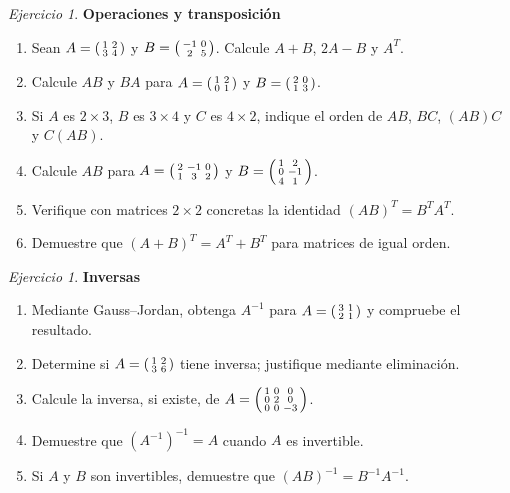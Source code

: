 \documentclass[12pt]{article}
\theoremstyle{remark}
\newtheorem{Ejer}[definicion]{Ejercicio}
\begin{document}
\begin{Ejer} \textbf{Operaciones y transposición}
\begin{enumerate}[start=6]
\item Sean $A=\begin{psmallmatrix}1&2\\3&4\end{psmallmatrix}$ y $B=\begin{psmallmatrix}-1&0\\2&5\end{psmallmatrix}$. Calcule $A+B$, $2A-B$ y $A^T$.
\item Calcule $AB$ y $BA$ para $A=\begin{psmallmatrix}1&2\\0&1\end{psmallmatrix}$ y $B=\begin{psmallmatrix}2&0\\1&3\end{psmallmatrix}$.
\item Si $A$ es $2\times3$, $B$ es $3\times4$ y $C$ es $4\times2$, indique el orden de $AB$, $BC$, $(AB)C$ y $C(AB)$.
\item Calcule $AB$ para $A=\begin{psmallmatrix}2&-1&0\\1&3&2\end{psmallmatrix}$ y $B=\begin{psmallmatrix}1&2\\0&-1\\4&1\end{psmallmatrix}$.
\item Verifique con matrices $2\times2$ concretas la identidad $(AB)^T=B^TA^T$.
\item Demuestre que $(A+B)^T=A^T+B^T$ para matrices de igual orden.
\end{enumerate}
\end{Ejer}

\begin{Ejer} \textbf{Inversas}
\begin{enumerate}[start=12]
\item Mediante Gauss--Jordan, obtenga $A^{-1}$ para $A=\begin{psmallmatrix}3&1\\2&1\end{psmallmatrix}$ y compruebe el resultado.
\item Determine si $A=\begin{psmallmatrix}1&2\\3&6\end{psmallmatrix}$ tiene inversa; justifique mediante eliminación.
\item Calcule la inversa, si existe, de $A=\begin{psmallmatrix}1&0&0\\0&2&0\\0&0&-3\end{psmallmatrix}$.
\item Demuestre que $(A^{-1})^{-1}=A$ cuando $A$ es invertible.
\item Si $A$ y $B$ son invertibles, demuestre que $(AB)^{-1}=B^{-1}A^{-1}$.
\end{enumerate}
\end{Ejer}
\end{document}
